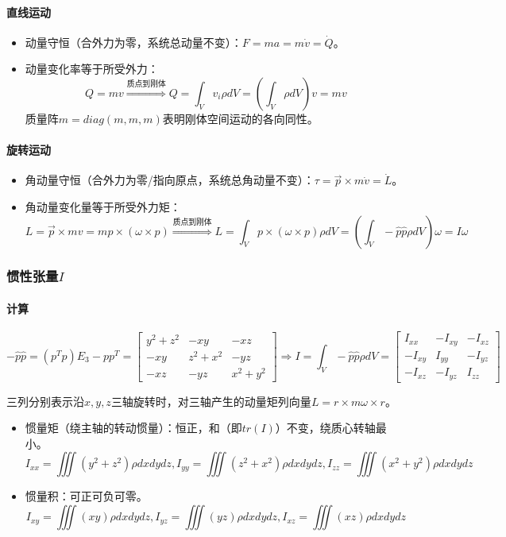 \documentclass[
12pt, %
a4paper, 
oneside, %
headinclude,footinclude, %
]{scrartcl}
\begin{document}
\paragraph{直线运动}
\begin{itemize}
\item 动量守恒（合外力为零，系统总动量不变）：$ F = ma = m \dot{v} = \dot{Q} $。
\item 动量变化率等于所受外力：
$$ Q = mv \overset{\text{质点到刚体}}{\Longrightarrow} Q = \int_V v_i \rho dV = (\int_V \rho dV) v = mv $$
质量阵$ m = diag(m, m, m) $表明刚体空间运动的各向同性。
\end{itemize} 
\paragraph{旋转运动}
\begin{itemize}
\item 角动量守恒（合外力为零/指向原点，系统总角动量不变）：$ \tau = \vec{p} \times m \dot{v} = \dot{L} $。
\item 角动量变化量等于所受外力矩：
$$ L = \vec{p} \times mv = mp \times (\omega \times p) \overset{\text{质点到刚体}}{\Longrightarrow} L = \int_V p \times (\omega \times p) \rho dV = (\int_V -\hat{p} \hat{p} \rho dV)\omega = I \omega $$
\end{itemize} 
\subsubsection[惯性张量]{惯性张量$ I $}
\paragraph{计算}
$$ -\hat{p} \hat{p} = (p^T p)E_3 - p p^T = \begin{bmatrix} y^2 + z^2 & -xy & -xz \\ -xy & z^2 + x^2 & -yz \\ -xz & -yz & x^2 + y^2 \end{bmatrix} \Rightarrow I = \int_V -\hat{p} \hat{p} \rho dV = \begin{bmatrix} I_{xx} & -I_{xy} & -I_{xz} \\ -I_{xy} & I_{yy} & -I_{yz} \\ -I_{xz} & -I_{yz} & I_{zz} \end{bmatrix} $$

三列分别表示沿$ x, y, z $三轴旋转时，对三轴产生的动量矩列向量$ L = r \times m \omega \times r $。
\begin{itemize}
\item 惯量矩（绕主轴的转动惯量）：恒正，和（即$ tr(I) $）不变，绕质心转轴最小。
$$ I_{xx} = \iiint (y^2 + z^2)\rho dxdydz, I_{yy} = \iiint (z^2 + x^2)\rho dxdydz, I_{zz} = \iiint (x^2 + y^2)\rho dxdydz $$
\item 惯量积：可正可负可零。
$$ I_{xy} = \iiint (xy)\rho dxdydz, I_{yz} = \iiint (yz)\rho dxdydz, I_{xz} = \iiint (xz)\rho dxdydz $$
\end{itemize} 
\end{document}
